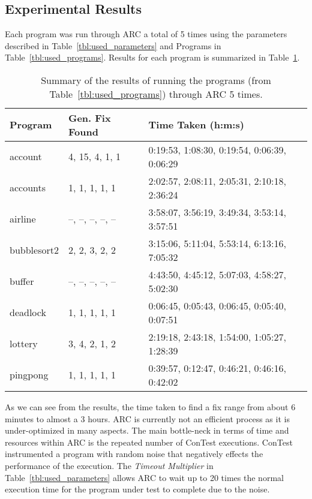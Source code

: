 \subsection{Experimental Results}
\label{sec:experimental_results}

Each program was run through ARC a total of 5 times using the parameters
described in Table~\ref{tbl:used_parameters} and Programs in
Table~\ref{tbl:used_programs}. Results for each program is summarized in
Table~\ref{tbl:summary_results}.

\begin{table}%
\caption{Summary of the results of running the programs
(from Table~\ref{tbl:used_programs}) through ARC 5 times.}
\begin{center}
\lstset{basicstyle=\scriptsize}
\begin{tabular}{|l|l|l|}
\hline
\textbf{Program} & \textbf{Gen. Fix Found} & \textbf{Time Taken (h:m:s)}\\
\hline
account & 4, 15, 4, 1, 1 & 0:19:53, 1:08:30, 0:19:54, 0:06:39, 0:06:29\\
\hline
accounts & 1, 1, 1, 1, 1 & 2:02:57, 2:08:11, 2:05:31, 2:10:18, 2:36:24\\
\hline
airline & --, --, --, --, -- & 3:58:07, 3:56:19, 3:49:34, 3:53:14, 3:57:51\\
\hline
bubblesort2 & 2, 2, 3, 2, 2 & 3:15:06, 5:11:04, 5:53:14, 6:13:16, 7:05:32 \\
\hline
buffer & --, --, --, --, -- & 4:43:50, 4:45:12, 5:07:03, 4:58:27, 5:02:30\\
\hline
deadlock & 1, 1, 1, 1, 1 & 0:06:45, 0:05:43, 0:06:45, 0:05:40, 0:07:51\\
\hline
lottery & 3, 4, 2, 1, 2 & 2:19:18, 2:43:18, 1:54:00, 1:05:27, 1:28:39\\
\hline
pingpong & 1, 1, 1, 1, 1 & 0:39:57, 0:12:47, 0:46:21, 0:46:16, 0:42:02\\
\hline
\end{tabular}
\label{tbl:summary_results}
\end{center}
\end{table}

As we can see from the results, the time taken to find a fix range from about 6
minutes to almost a 3 hours. ARC is currently not an efficient process as it is
under-optimized in many aspects. The main bottle-neck in terms of time and
resources within ARC is the repeated number of ConTest executions. ConTest
instrumented a program with random noise that negatively effects the
performance of the execution.  The \textit{Timeout Multiplier} in
Table~\ref{tbl:used_parameters} allows ARC to wait up to 20 times the normal
execution time for the program under test to complete due to the noise.

